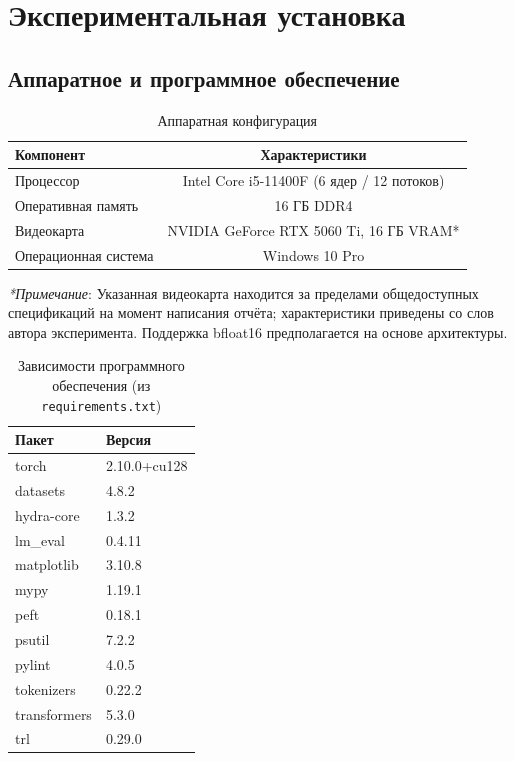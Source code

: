 \documentclass[a4paper,12pt]{article}
\begin{document}
\section{Экспериментальная установка}
\label{sec:experiments}

\subsection{Аппаратное и программное обеспечение}

\begin{table}[H]
\centering
\caption{Аппаратная конфигурация}
\label{tab:hardware}
\begin{tabular}{lc}
\toprule
\textbf{Компонент} & \textbf{Характеристики} \\
\midrule
Процессор & Intel Core i5-11400F (6 ядер / 12 потоков) \\
Оперативная память & 16 ГБ DDR4 \\
Видеокарта & NVIDIA GeForce RTX 5060 Ti, 16 ГБ VRAM* \\
Операционная система & Windows 10 Pro \\
\bottomrule
\end{tabular}
\end{table}

\noindent\textit{*Примечание}: Указанная видеокарта находится за пределами общедоступных спецификаций на момент написания отчёта; характеристики приведены со слов автора эксперимента. Поддержка bfloat16 предполагается на основе архитектуры.

\begin{table}[H]
\centering
\caption{Зависимости программного обеспечения (из \texttt{requirements.txt})}
\label{tab:software}
\begin{tabular}{ll}
\toprule
\textbf{Пакет} & \textbf{Версия} \\
\midrule
torch & 2.10.0+cu128 \\
datasets & 4.8.2 \\
hydra-core & 1.3.2 \\
lm\_eval & 0.4.11 \\
matplotlib & 3.10.8 \\
mypy & 1.19.1 \\
peft & 0.18.1 \\
psutil & 7.2.2 \\
pylint & 4.0.5 \\
tokenizers & 0.22.2 \\
transformers & 5.3.0 \\
trl & 0.29.0 \\
\bottomrule
\end{tabular}
\end{table}
\end{document}
